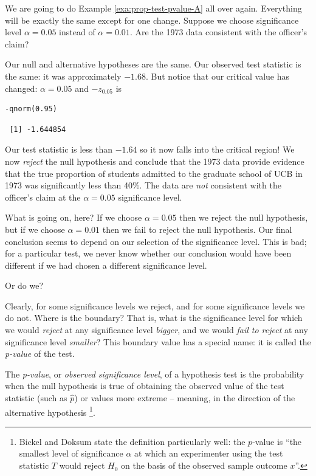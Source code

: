 \documentclass[captions=tableheading]{scrbook}
\begin{document}
\begin{example}
\label{exa:prop-test-pvalue-B}
We are going to do Example \ref{exa:prop-test-pvalue-A} all over again. Everything will be exactly the same except for one change. Suppose we choose significance level \(\alpha=0.05\) instead of \(\alpha=0.01\). Are the 1973 data consistent with the officer's claim?

Our null and alternative hypotheses are the same. Our observed test statistic is the same: it was approximately \(-1.68\). But notice that our critical value has changed: \(\alpha=0.05\) and \(-z_{0.05}\) is 
\end{example}

\begin{verbatim}
-qnorm(0.95)
\end{verbatim}

\begin{verbatim}
 [1] -1.644854
\end{verbatim}

Our test statistic is less than \(-1.64\) so it now falls into the critical region! We now \emph{reject} the null hypothesis and conclude that the 1973 data provide evidence that the true proportion of students admitted to the graduate school of UCB in 1973 was significantly less than 40\%. The data are \emph{not} consistent with the officer's claim at the \(\alpha=0.05\) significance level.

What is going on, here? If we choose \(\alpha=0.05\) then we reject the null hypothesis, but if we choose \(\alpha=0.01\) then we fail to reject the null hypothesis. Our final conclusion seems to depend on our selection of the significance level. This is bad; for a particular test, we never know whether our conclusion would have been different if we had chosen a different significance level. 

Or do we?

Clearly, for some significance levels we reject, and for some significance levels we do not. Where is the boundary? That is, what is the significance level for which we would \emph{reject} at any significance level \emph{bigger}, and we would \emph{fail to reject} at any significance level \emph{smaller}? This boundary value has a special name: it is called the \emph{p-value} of the test.

\begin{defn}
The \emph{p-value}, or \emph{observed significance level}, of a hypothesis test is the probability when the null hypothesis is true of obtaining the observed value of the test statistic (such as \(\hat{p}\)) or values more extreme -- meaning, in the direction of the alternative hypothesis
\footnote{Bickel and Doksum \cite{Bickel2001} state the definition particularly well: the \(p\)-value is ``the smallest level of significance \(\alpha\) at which an experimenter using the test statistic \(T\) would reject \(H_{0}\) on the basis of the observed sample outcome \(x\)''.}. 
\end{defn}
\end{document}
